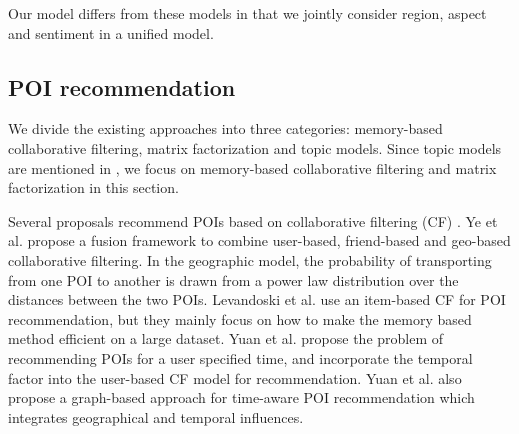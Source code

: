 Our model differs from these models in that
we jointly consider region, aspect and sentiment in a unified model.

\subsection{POI recommendation}
We divide the existing approaches into
three categories: memory-based collaborative filtering,
matrix factorization and topic models. Since topic models are mentioned
in , we focus on memory-based collaborative filtering and
matrix factorization in this section.

Several proposals recommend POIs based on collaborative filtering (CF)
\cite{YeGeoSocial:2011,Levandoski:2012,YuanPOI:2013}.
Ye et al. \cite{YeGeoSocial:2011} propose a fusion framework to
combine user-based, friend-based and geo-based collaborative
filtering. In the geographic model, the probability of transporting
from one POI to another is drawn from a power law distribution over
the distances between the two POIs. Levandoski et al. \cite{Levandoski:2012}
use an item-based CF for POI recommendation, but they mainly
focus on how to make the memory based method efficient on a large dataset.
Yuan et al.
\cite{YuanPOI:2013} propose the problem of recommending POIs
for a user specified time, and incorporate the temporal factor 
into the user-based CF model for recommendation.  Yuan et al.
\cite{Yuan:2014:GBPB} also propose a graph-based approach for time-aware
POI recommendation which integrates geographical and temporal
influences.


